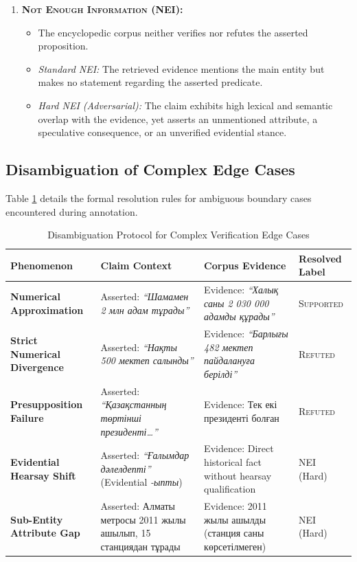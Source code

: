 \begin{enumerate}
    \item \textbf{\textsc{Not Enough Information (NEI)}:}
    \begin{itemize}
        \item The encyclopedic corpus neither verifies nor refutes the asserted proposition.
        \item \textit{Standard NEI:} The retrieved evidence mentions the main entity but makes no statement regarding the asserted predicate.
        \item \textit{Hard NEI (Adversarial):} The claim exhibits high lexical and semantic overlap with the evidence, yet asserts an unmentioned attribute, a speculative consequence, or an unverified evidential stance.
    \end{itemize}
\end{enumerate}

\subsection{Disambiguation of Complex Edge Cases}
Table \ref{tab:fever_edge_cases} details the formal resolution rules for ambiguous boundary cases encountered during annotation.

\begin{table}[htbp]
\centering
\caption{Disambiguation Protocol for Complex Verification Edge Cases}
\label{tab:fever_edge_cases}
\small
\begin{tabular}{p{3.2cm}p{4.5cm}p{4.0cm}p{1.8cm}}
\toprule
\textbf{Phenomenon} & \textbf{Claim Context} & \textbf{Corpus Evidence} & \textbf{Resolved Label} \\
\midrule
\textbf{Numerical Approximation} & Asserted: \textit{``Шамамен 2 млн адам тұрады''} & Evidence: \textit{``Халық саны 2 030 000 адамды құрады''} & \textsc{Supported} \\
\midrule
\textbf{Strict Numerical Divergence} & Asserted: \textit{``Нақты 500 мектеп салынды''} & Evidence: \textit{``Барлығы 482 мектеп пайдалануға берілді''} & \textsc{Refuted} \\
\midrule
\textbf{Presupposition Failure} & Asserted: \textit{``Қазақстанның төртінші президенті\dots''} & Evidence: Тек екі президенті болған & \textsc{Refuted} \\
\midrule
\textbf{Evidential Hearsay Shift} & Asserted: \textit{``Ғалымдар дәлелдепті''} (Evidential \textit{-ыпты}) & Evidence: Direct historical fact without hearsay qualification & \textsc{NEI} (Hard) \\
\midrule
\textbf{Sub-Entity Attribute Gap} & Asserted: Алматы метросы 2011 жылы ашылып, 15 станциядан тұрады & Evidence: 2011 жылы ашылды (станция саны көрсетілмеген) & \textsc{NEI} (Hard) \\
\bottomrule
\end{tabular}
\end{table}

